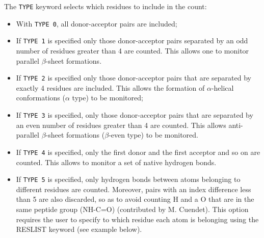 \documentclass[12pt,fleqn]{report}
\begin{document}
The {\tt TYPE} keyword selects which residues to include in the count:
\begin{itemize}
\item With {\tt TYPE 0}, all donor-acceptor pairs are included;
\item If {\tt TYPE 1} is specified only those donor-acceptor pairs separated by an odd number of
residues greater than 4 are counted.  This allows one to monitor parallel $\beta$-sheet formations.
\item If {\tt TYPE 2} is specified only those donor-acceptor pairs that are separated by exactly 4 
residues are included.  This allows the formation of $\alpha$-helical conformations
($\alpha$ type) to be monitored; 
\item If {\tt TYPE 3} is specified,  only those donor-acceptor pairs that are separated by
an even number of residues greater than 4 are counted.
 This allows anti-parallel $\beta$-sheet formations ($\beta$-even type) to be monitored.
\item If {\tt TYPE 4} is specified,  only the first  donor and the first acceptor and so on are counted.
 This allows to monitor a set of native hydrogen bonds.
\item If {\tt TYPE 5} is specified, only hydrogen bonds between atoms belonging to different residues
are counted. Moreover, pairs with an index difference less than 5 are also discarded, so as 
to avoid counting H and a O that are in the same peptide group (NH-C=O) (contributed by M. Cuendet).
This option requires the user to specify to which residue each atom is belonging using
the RESLIST keyword (see example below).
\end{itemize}
\end{document}
